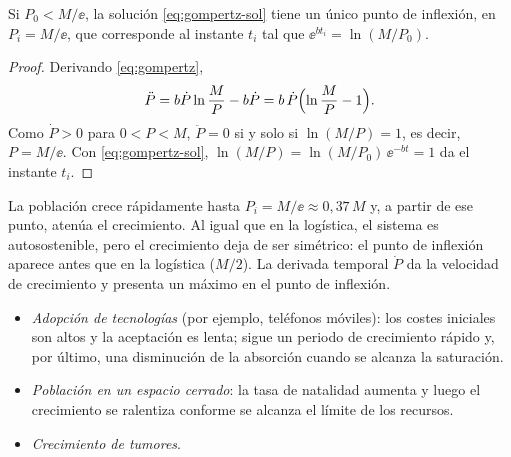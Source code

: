 \begin{lemma}\label{lem:gompertz}
Si $P_0<M/\ee$, la solución \eqref{eq:gompertz-sol} tiene un único punto de inflexión, en $P_i=M/\ee$, que corresponde al instante $t_i$ tal que $\ee^{bt_i}=\ln(M/P_0)$.
\end{lemma}

\begin{proof}
Derivando \eqref{eq:gompertz},
\[
  \ddot P = b\dot P\ln\frac{M}{P} - b\dot P = b\,\dot P\Bigl(\ln\frac{M}{P}-1\Bigr).
\]
Como $\dot P>0$ para $0<P<M$, $\ddot P=0$ si y solo si $\ln(M/P)=1$, es decir, $P=M/\ee$. Con \eqref{eq:gompertz-sol}, $\ln(M/P)=\ln(M/P_0)\,\ee^{-bt}=1$ da el instante $t_i$.
\end{proof}

La población crece rápidamente hasta $P_i=M/\ee\approx 0{,}37\,M$ y, a partir de ese punto, atenúa el crecimiento. Al igual que en la logística, el sistema es autosostenible, pero el crecimiento deja de ser simétrico: el punto de inflexión aparece antes que en la logística ($M/2$). La derivada temporal $\dot P$ da la velocidad de crecimiento y presenta un máximo en el punto de inflexión.

\begin{remark}\leavevmode
\begin{itemize}
  \item \emph{Adopción de tecnologías} (por ejemplo, teléfonos móviles): los costes iniciales son altos y la aceptación es lenta; sigue un periodo de crecimiento rápido y, por último, una disminución de la absorción cuando se alcanza la saturación.
  \item \emph{Población en un espacio cerrado}: la tasa de natalidad aumenta y luego el crecimiento se ralentiza conforme se alcanza el límite de los recursos.
  \item \emph{Crecimiento de tumores}.
\end{itemize}
\end{remark}


